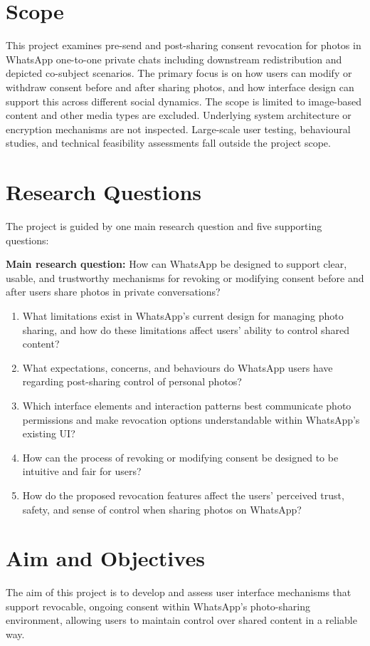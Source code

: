 \documentclass[11pt]{informatics-report}
\begin{document}
\section{Scope}
This project examines pre-send and post-sharing consent revocation for photos in WhatsApp one-to-one private chats including downstream redistribution and depicted co-subject scenarios. The primary focus is on how users can modify or withdraw consent before and after sharing photos, and how interface design can support this across different social dynamics. The scope is limited to image-based content and other media types are excluded. Underlying system architecture or encryption mechanisms are not inspected. Large-scale user testing, behavioural studies, and technical feasibility assessments fall outside the project scope.

\section{Research Questions}
The project is guided by one main research question and five supporting questions:

\noindent\textbf{Main research question:} How can WhatsApp be designed to support clear, usable, and trustworthy mechanisms for revoking or modifying consent before and after users share photos in private conversations?
\begin{enumerate}
\item What limitations exist in WhatsApp’s current design for managing photo sharing, and how do these limitations affect users’ ability to control shared content?
\item What expectations, concerns, and behaviours do WhatsApp users have regarding post-sharing control of personal photos?
\item Which interface elements and interaction patterns best communicate photo permissions and make revocation options understandable within WhatsApp’s existing UI?
\item How can the process of revoking or modifying consent be designed to be intuitive and fair for users?
\item How do the proposed revocation features affect the users’ perceived trust, safety, and sense of control when sharing photos on WhatsApp?
\end{enumerate}

\section{Aim and Objectives}
The aim of this project is to develop and assess user interface mechanisms that support revocable, ongoing consent within WhatsApp’s photo-sharing environment, allowing users to maintain control over shared content in a reliable way.
\end{document}
